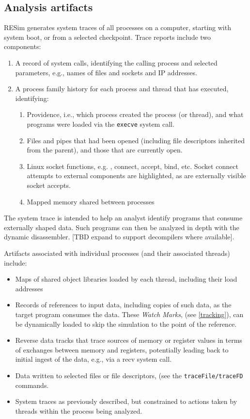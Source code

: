 \documentclass[titlepage]{article}
\begin{document}
\subsection{Analysis artifacts}
RESim generates system traces of all processes on a computer, starting with system boot, or from a selected checkpoint.  Trace reports include two components: 
\begin{enumerate}
\item A record of system calls, identifying the calling process and selected parameters, e.g., names of files and sockets and IP addresses.
\item A process family history for each process and thread that has executed, identifying:
\begin{enumerate}
\item Providence, i.e., which process created the process (or thread), and what programs were loaded via the {\tt execve} system call.
\item Files and pipes that had been opened (including file descriptors inherited from the parent), and those that are currently open.
\item Linux socket functions, e.g. , connect, accept, bind, etc.  Socket connect attempts to external components are highlighted, as are 
externally visible socket accepts.
\item Mapped memory shared between processes
\end{enumerate}
\end{enumerate}

The system trace is intended to help an analyst identify programs that consume externally shaped data.  Such programs can then be analyzed in depth with the dynamic disassembler. [TBD expand to support decompilers where available].  

Artifacts associated with individual processes (and their associated threads) include:
\begin{itemize}
\item Maps of shared object libraries loaded by each thread, including their load addresses
\item Records of references to input data, including copies of such data, as the target program consumes the data.  These \textit{Watch Marks}, 
(see \ref{tracking}), can be dynamically loaded to skip the simulation to the point of the reference.
\item Reverse data tracks that trace sources of memory or register values in terms of exchanges between memory and registers, potentially leading
back to initial ingest of the data, e.g., via a recv system call.
\item Data written to selected files or file descriptors, (see the {\tt traceFile/traceFD} commands.
\item System traces as previously described, but constrained to actions taken by threads within the process being analyzed.
\end{itemize}
\end{document}
